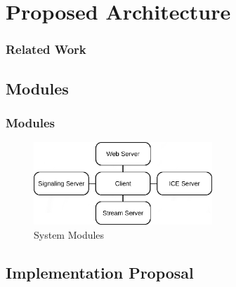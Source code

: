 \documentclass[compress]{beamer}
\begin{document}



\section{Proposed Architecture}\label{arch}

\begin{frame}[t,shrink]
\frametitle{Related Work} 
\end{frame}

\subsection{Modules}

	\begin{frame}[c]
		\frametitle{Modules}
		\begin{figure}[H]
			\includegraphics[width=0.6\textwidth]{figures/archs.png}
			\caption{System Modules}
		\end{figure}
	\end{frame}

\subsection{Implementation Proposal}
\end{document}
